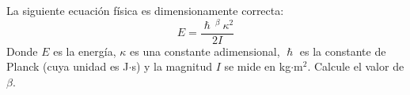 \noindent La siguiente ecuación física es dimensionamente correcta:
$$ E=\frac{\hslash\,^\beta \ \kappa^2}{2I} $$
Donde $E$ es la energ\'ia, $\kappa$ es una constante adimensional, $\hslash$ es la constante de Planck (cuya unidad es J$\cdot$s) y la magnitud $I$ se mide en kg$\cdot$m$^2$. Calcule el valor de $\beta$.
